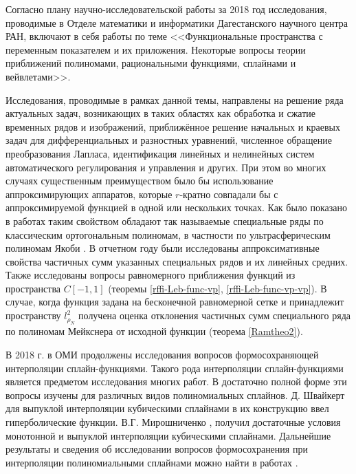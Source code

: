 \Introduction

Согласно плану научно-исследовательской работы за 2018 год исследования, проводимые в Отделе математики и информатики Дагестанского научного центра РАН, включают в себя работы по теме
<<Функциональные пространства с переменным показателем и их приложения. Некоторые вопросы теории приближений полиномами, рациональными функциями, сплайнами и вейвлетами>>.

Исследования, проводимые в рамках данной темы, направлены на решение ряда актуальных задач, возникающих в таких областях как обработка и сжатие временных рядов и изображений, приближённое решение начальных и краевых задач для дифференциальных и разностных уравнений, численное обращение преобразования Лапласа, идентификация линейных и нелинейных систем автоматического регулирования и управления и других.
При этом во многих случаях существенным преимуществом было бы использование аппроксимирующих аппаратов, которые $r$-кратно  совпадали бы с аппроксимируемой функцией в одной или нескольких точках.
Как было показано в работах \cite{rffi-13, rffi-14, rffi-15, laplas-Shar11,RamVMJ} таким свойством обладают так называемые специальные ряды по классическим ортогональным полиномам, в частности по ультрасферическим полиномам Якоби \cite{rffi-13}.
В отчетном году были исследованы аппроксимативные свойства частичных сумм указанных специальных рядов  и их линейных средних. %
Также исследованы вопросы равномерного приближения функций из пространства $C[-1,1]$ (теоремы \ref{rffi-Leb-func-vp}, \ref{rffi-Leb-func-vp-vp}).
В случае, когда функция задана на бесконечной равномерной сетке и принадлежит пространству $l^2_{\rho_N}$ получена оценка отклонения частичных сумм специального ряда по полиномам Мейкснера от исходной функции (теорема \ref{Ramtheo2}).

В 2018 г. в ОМИ продолжены исследования вопросов формосохраняющей интерполяции сплайн-функциями.
Такого рода интерполяции сплайн-функциями
является предметом исследования многих работ. В достаточно полной форме эти вопросы изучены для различных
видов полиномиальных сплайнов. Д. Швайкерт \cite{ark-1} для выпуклой интерполяции кубическими
сплайнами в их конструкцию ввел гиперболические функции. В.Г. Мирошниченко \cite{ark-2},\cite{ark-3}
получил достаточные условия монотонной и выпуклой интерполяции кубическими сплайнами.
Дальнейшие результаты и сведения об исследовании вопросов формосохранения при интерполяции
полиномиальными сплайнами можно найти в работах \cite{ark-4, ark-5, ark-6, ark-7}.

